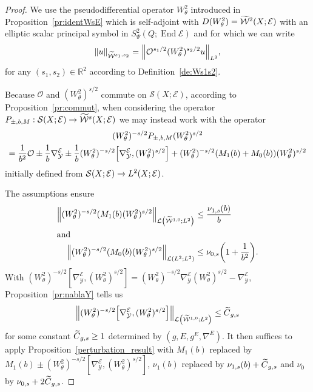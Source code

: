 \documentclass[10pt]{amsart}
\theoremstyle{definition}\newtheorem{defi}[theo]{Definition}\newtheorem{rema}[theo]{Remark}\newtheorem{exam}[theo]{Example}\newtheorem{exem}[theo]{Example}\newtheorem{nota}[theo]{Notation}
\newcommand{\R}{\mathbb{R}}
\newcommand{\clW}{\mathcal{W}}
\newcommand{\clY}{\mathcal{Y}}
\newcommand{\clO}{\mathcal{O}}
\newcommand{\clE}{\mathcal{E}}
\newcommand{\clS}{\mathcal{S}}
\newcommand{\clL}{\mathcal{L}}
\DeclareMathOperator{\End}{End}
\let\oldtilde\tilde
\renewcommand*{\tilde}[1]{\mathchoice{\widetilde{#1}}{\widetilde{#1}}{\oldtilde{#1}}{\oldtilde{#1}}}
\let\originalleft\left
\let\originalright\right
\renewcommand{\left}{\mathopen{}\mathclose\bgroup\originalleft}
\renewcommand{\right}{\aftergroup\egroup\originalright}
\renewcommand*{\to}{\mathchoice{\longrightarrow}{\rightarrow}{\rightarrow}{\rightarrow}}
\begin{document}
\begin{proof}
We use the pseudodifferential operator $W^{2}_{\theta}$ introduced in Proposition~\ref{pr:identWsE} which is self-adjoint with $D(W^{2}_{\theta})=\tilde{\clW}^{2}(X;\clE)$ with an elliptic scalar principal symbol in $S^{2}_{\Psi}(Q;\End\clE)$ and for which we can write
\[
\|u\|_{\widetilde{\clW}^{s_{1},s_{2}}}=\left\|\clO^{s_{1}/2}(W^{2}_{\theta})^{s_{2}/2}u\right\|_{L^{2}},
\]
for any $(s_{1},s_{2})\in \R^{2}$ according to Definition~\ref{de:Ws1s2}.

Because $\clO$ and $(W^{2}_{\theta})^{s/2}$ commute on $\clS(X;\clE)$, according to Proposition~\ref{pr:commut}, when considering the operator $P_{\pm,b,M}:\clS(X;\clE)\to \tilde{\clW}^{s}(X;\clE)$ we may instead work with the operator
\begin{multline*}
(W^2_{\theta})^{-s/2}P_{\pm,b,M}(W^2_{\theta})^{s/2}
\\
=\frac{1}{b^{2}}\clO\pm \frac{1}{b}\nabla_{\clY}^{\clE}\pm\frac{1}{b}(W^2_{\theta})^{-s/2}\left[\nabla_{\clY}^{\clE},(W^2_{\theta})^{s/2}\right]
+ (W^2_{\theta})^{-s/2}(M_{1}(b)+M_{0}(b))(W^2_{\theta})^{s/2}
\end{multline*}
initially defined from $\clS(X;\clE)\to L^{2}(X;\clE)$.

The assumptions ensure
\begin{align*}
\left\|(W^2_{\theta})^{-s/2}(M_{1}(b)(W^2_{\theta})^{s/2}\right\|_{\clL\left(\widetilde{\clW}^{1,0};L^{2}\right)}&\leq \frac{\nu_{1,s}(b)}{b}\\
\intertext{and}
\left\|(W^2_{\theta})^{-s/2}(M_{0}(b)(W^2_{\theta})^{s/2}\right\|_{\clL(L^{2};L^{2})} &\leq
\nu_{0,s}\left(1+\frac{1}{b^{2}}\right).
\end{align*}
With $(W^2_{\theta})^{-s/2}[\nabla_{\clY}^{\clE},(W^2_{\theta})^{s/2}]=(W^2_{\theta})^{-s/2}\nabla_{\clY}^{\clE}(W^2_{\theta})^{s/2}-\nabla_{\clY}^{\clE}$, Proposition~\ref{pr:nablaY} tells us
\begin{equation}\label{eq:commutnabY}
\left\|(W^2_{\theta})^{-s/2}\left[\nabla_{\clY}^{\clE},(W^2_{\theta})^{s/2}\right]\right\|_{\clL\left(\widetilde{\clW}^{1,0};L^{2}\right)}\leq \tilde{C}_{g,s}
\end{equation}
for some constant $\tilde{C}_{g,s}\geq 1$ determined by $(g,E,g^{E},\nabla^{E})$. It then suffices to apply Proposition~\ref{perturbation_result} with $M_{1}(b)$ replaced by $M_{1}(b)\pm(W^2_{\theta})^{-s/2}[\nabla_{\clY}^{\clE},(W^2_{\theta})^{s/2}]$, $\nu_{1}(b)$ replaced by $\nu_{1,s}(b)+\tilde{C}_{g,s}$ and $\nu_{0}$ by $\nu_{0,s}+2\tilde{C}_{g,s}$.
\end{proof}
\end{document}

